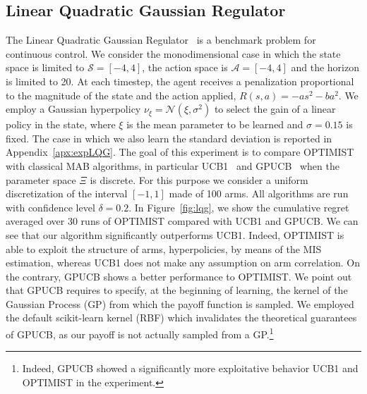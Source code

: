 \documentclass{article}
\makeatletter
\DeclareRobustCommand{\algoname}{OPTIMIST\@\xspace}
\makeatother
\begin{document}
\subsection{Linear Quadratic Gaussian Regulator}
The Linear Quadratic Gaussian Regulator~\citep[LQG,][]{dorato1995linear} is a benchmark problem for continuous control. We consider the monodimensional case in which the state space is limited to $\mathcal{S}=[-4,4]$, the action space is $\mathcal{A}=[-4,4]$ and the horizon is limited to 20. At each timestep, the agent receives a penalization proportional to the magnitude of the state and the action applied, \ie $R(s,a) = -a s^2 - b  a^2$. We employ a Gaussian hyperpolicy $\nu_{\xi} = \mathcal{N}( \xi, \sigma^2)$ to select the gain of a linear policy in the state, where $\xi$ is the mean parameter to be learned and $\sigma=0.15$ is fixed. The case in which we also learn the standard deviation is reported in Appendix~\ref{apx:expLQG}. The goal of this experiment is to compare \algoname
with classical MAB algorithms, in particular UCB1~\cite{auer2002finite} and GPUCB~\cite{srinivas2010gaussian} when the parameter space $\Xi$ is discrete. For this purpose we consider a uniform discretization of the interval $[-1,1]$ made of 100 arms. All algorithms are run with confidence level $\delta=0.2$.
In Figure~\ref{fig:lqg}, we show the cumulative regret averaged over 30 runs of \algoname compared with UCB1 and GPUCB. We can see that our algorithm significantly outperforms UCB1. Indeed, \algoname is
able to exploit the structure of arms, \ie hyperpolicies, by means of the MIS estimation, whereas UCB1 does not make any assumption on arm correlation. On the contrary, GPUCB shows a better performance \wrt to \algoname. We point out that GPUCB requires to specify, at the beginning of learning, the kernel of the Gaussian Process (GP) from which the payoff function is sampled. We employed the default scikit-learn kernel (RBF) which invalidates the theoretical guarantees of GPUCB, as our payoff is not actually sampled from a GP.\footnote{Indeed, GPUCB showed a significantly more exploitative behavior \wrt UCB1 and \algoname in the experiment.}
\end{document}
